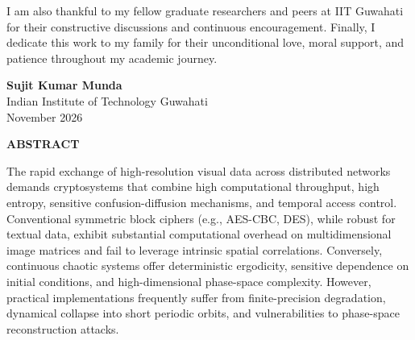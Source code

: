 \documentclass[12pt,a4paper,oneside]{report}
\begin{document}
I am also thankful to my fellow graduate researchers and peers at IIT Guwahati for their constructive discussions and continuous encouragement. Finally, I dedicate this work to my family for their unconditional love, moral support, and patience throughout my academic journey.

\vspace{1.5cm}
\noindent \textbf{Sujit Kumar Munda} \\
Indian Institute of Technology Guwahati \\
November 2026

\newpage
\thispagestyle{plain}
\begin{center}
    {\Large \bfseries ABSTRACT} \par
\end{center}
\vspace{0.6cm}

The rapid exchange of high-resolution visual data across distributed networks demands cryptosystems that combine high computational throughput, high entropy, sensitive confusion-diffusion mechanisms, and temporal access control. Conventional symmetric block ciphers (e.g., AES-CBC, DES), while robust for textual data, exhibit substantial computational overhead on multidimensional image matrices and fail to leverage intrinsic spatial correlations. Conversely, continuous chaotic systems offer deterministic ergodicity, sensitive dependence on initial conditions, and high-dimensional phase-space complexity. However, practical implementations frequently suffer from finite-precision degradation, dynamical collapse into short periodic orbits, and vulnerabilities to phase-space reconstruction attacks.
\end{document}
